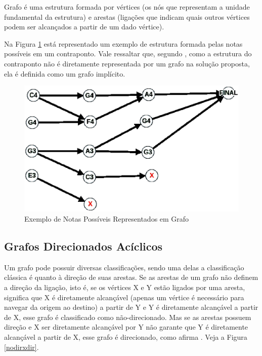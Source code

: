     Grafo é uma estrutura formada por vértices (os nós que representam a unidade fundamental da estrutura) e arestas (ligações que indicam quais outros vértices podem ser alcançados a partir de um dado vértice).

    Na Figura \ref{grafonotas} está representado um exemplo de estrutura formada pelas notas possíveis em um contraponto. Vale ressaltar que, segundo , como a estrutura do contraponto não é diretamente representada por um grafo na solução proposta, ela é definida como um grafo implícito.

    \begin{figure}[htb]
      \centering
      \includegraphics[scale=0.55]{figuras/grafonotas.eps}
      \caption{Exemplo de Notas Possíveis Representados em Grafo}
      \label{grafonotas}
    \end{figure}

    \subsection[Grafos Direcionados Acíclicos]{Grafos Direcionados Acíclicos}

      Um grafo pode possuir diversas classificações, sendo uma delas a classificação clássica é quanto à direção de suas arestas. Se as arestas de um grafo não definem a direção da ligação, isto é, se os vértices X e Y estão ligados por uma aresta, significa que X é diretamente alcançável (apenas um vértice é necessário para navegar da origem ao destino) a partir de Y e Y é diretamente alcançável a partir de X, esse grafo é classificado como não-direcionado. Mas se as arestas possuem direção e X ser diretamente alcançável por Y não garante que Y é diretamente alcançável a partir de X, esse grafo é direcionado, como afirma . Veja a Figura \ref{nodirxdir}.

